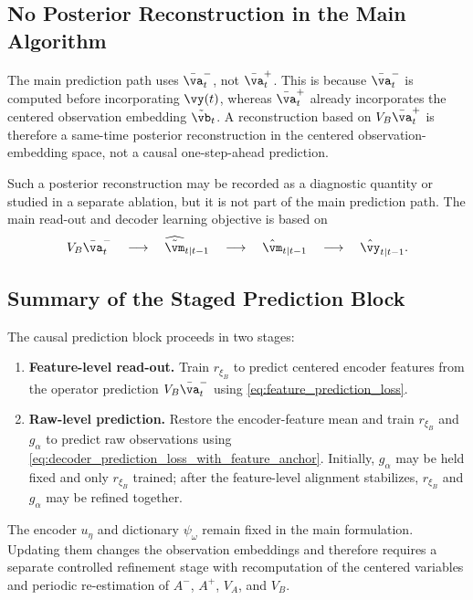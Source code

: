 \documentclass[twoside,11pt]{article}
\begin{document}
\subsection{No Posterior Reconstruction in the Main Algorithm}

The main prediction path uses $\bar{\va}_t^-$, not $\bar{\va}_t^+$. This
is because $\bar{\va}_t^-$ is computed before incorporating $\vy(t)$,
whereas $\bar{\va}_t^+$ already incorporates the centered observation
embedding $\tilde{\vb}_t$. A reconstruction based on
$V_B\bar{\va}_t^+$ is therefore a same-time posterior reconstruction in
the centered observation-embedding space, not a causal one-step-ahead
prediction.

Such a posterior reconstruction may be recorded as a diagnostic quantity
or studied in a separate ablation, but it is not part of the main
prediction path. The main read-out and decoder learning objective is
based on
\begin{align}
V_B\bar{\va}_t^-
\quad\longrightarrow\quad
\widehat{\tilde{\vm}}_{t|t-1}
\quad\longrightarrow\quad
\hat{\vm}_{t|t-1}
\quad\longrightarrow\quad
\hat{\vy}_{t|t-1}.
\label{eq:main_causal_prediction_path}
\end{align}

\subsection{Summary of the Staged Prediction Block}

The causal prediction block proceeds in two stages:
\begin{enumerate}
\item \textbf{Feature-level read-out.}
Train $r_{\xi_B}$ to predict centered encoder features from the
operator prediction $V_B\bar{\va}_t^-$ using
\eqref{eq:feature_prediction_loss}.
\item \textbf{Raw-level prediction.}
Restore the encoder-feature mean and train $r_{\xi_B}$ and $g_\alpha$
to predict raw observations using
\eqref{eq:decoder_prediction_loss_with_feature_anchor}. Initially,
$g_\alpha$ may be held fixed and only $r_{\xi_B}$ trained; after the
feature-level alignment stabilizes, $r_{\xi_B}$ and $g_\alpha$ may be
refined together.
\end{enumerate}
The encoder $u_\eta$ and dictionary $\psi_\omega$ remain fixed in the
main formulation. Updating them changes the observation embeddings and
therefore requires a separate controlled refinement stage with
recomputation of the centered variables and periodic re-estimation of
$A^-$, $A^+$, $V_A$, and $V_B$.
\end{document}

